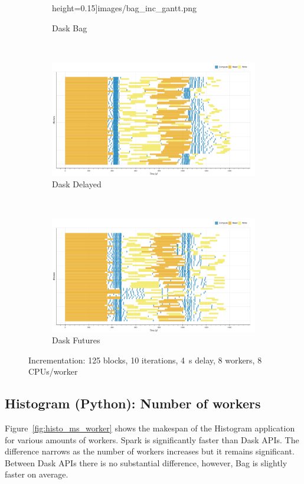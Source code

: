 \documentclass[conference]{IEEEtran}
\begin{document}
\begin{figure}[!b]
\begin{subfigure}[b]{\columnwidth}
        height=0.15\textheight]{images/bag_inc_gantt.png}%
        \caption{Dask Bag}\label{fig:inc_dask_bag_gantt}
    \end{subfigure}
    \\
    \begin{subfigure}[b]{\columnwidth}
        \includegraphics[clip,width=\columnwidth,
        height=0.15\textheight]{images/delayed_inc_gantt.png}%
        \caption{Dask Delayed}\label{fig:inc_dask_delayed_gantt}
    \end{subfigure}
    \\
    \begin{subfigure}[b]{\columnwidth}
        \includegraphics[clip,width=\columnwidth,
        height=0.15\textheight]{images/futures_inc_gantt.png}%
        \caption{Dask Futures}\label{fig:inc_dask_futures_gantt}
    \end{subfigure}
    \caption{Incrementation: 125 blocks, 10 iterations, \SI{4}{\second} delay, 8 workers,
8 CPUs/worker}\label{fig:inc_gantt}
\end{figure}

\subsection{Histogram (Python): Number of workers}
Figure~\ref{fig:histo_ms_worker} shows the makespan of the Histogram application for various
amounts of workers. Spark is significantly faster than Dask APIs. The difference
narrows as the number of workers increases but it remains significant. Between Dask APIs
there is no substantial difference, however, Bag is slightly faster on average.
\end{document}
